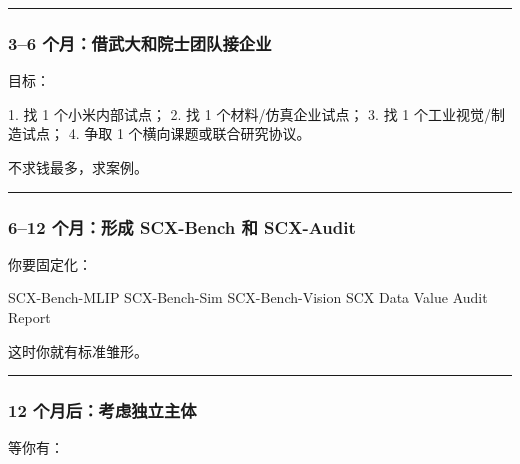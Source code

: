 \documentclass[
  12pt,
]{ctexart}
\newenvironment{Shaded}{}{}
\newcommand{\NormalTok}[1]{#1}
\begin{document}
\begin{center}\rule{0.5\linewidth}{0.5pt}\end{center}

\subsubsection{3--6
个月：借武大和院士团队接企业}\label{ux4e2aux6708ux501fux6b66ux5927ux548cux9662ux58ebux56e2ux961fux63a5ux4f01ux4e1a}

目标：

\begin{Shaded}
\begin{Highlighting}[]
\NormalTok{1. 找 1 个小米内部试点；}
\NormalTok{2. 找 1 个材料/仿真企业试点；}
\NormalTok{3. 找 1 个工业视觉/制造试点；}
\NormalTok{4. 争取 1 个横向课题或联合研究协议。}
\end{Highlighting}
\end{Shaded}

不求钱最多，求案例。

\begin{center}\rule{0.5\linewidth}{0.5pt}\end{center}

\subsubsection{6--12 个月：形成 SCX-Bench 和
SCX-Audit}\label{ux4e2aux6708ux5f62ux6210-scx-bench-ux548c-scx-audit}

你要固定化：

\begin{Shaded}
\begin{Highlighting}[]
\NormalTok{SCX{-}Bench{-}MLIP}
\NormalTok{SCX{-}Bench{-}Sim}
\NormalTok{SCX{-}Bench{-}Vision}
\NormalTok{SCX Data Value Audit Report}
\end{Highlighting}
\end{Shaded}

这时你就有标准雏形。

\begin{center}\rule{0.5\linewidth}{0.5pt}\end{center}

\subsubsection{12
个月后：考虑独立主体}\label{ux4e2aux6708ux540eux8003ux8651ux72ecux7acbux4e3bux4f53}

等你有：
\end{document}

